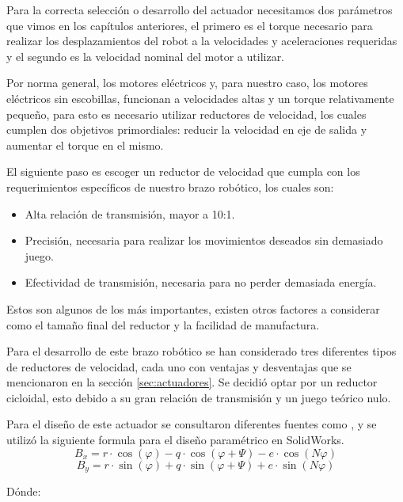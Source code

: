 Para la correcta selección o desarrollo del actuador necesitamos dos parámetros que vimos en los capítulos anteriores, el primero es el torque necesario para realizar los desplazamientos del robot a la velocidades y aceleraciones requeridas y el segundo es la velocidad nominal del motor a utilizar.

Por norma general, los motores eléctricos y, para nuestro caso, los motores eléctricos sin escobillas, funcionan a velocidades altas y un torque relativamente pequeño, para esto es necesario utilizar reductores de velocidad, los cuales cumplen dos objetivos primordiales: reducir la velocidad en eje de salida y aumentar el torque en el mismo.

El siguiente paso es escoger un reductor de velocidad que cumpla con los requerimientos específicos de nuestro brazo robótico, los cuales son:

\begin{itemize}
\itemsep0em
\item Alta relación de transmisión, mayor a 10:1.
\item Precisión, necesaria para realizar los movimientos deseados sin demasiado juego. 
\item Efectividad de transmisión, necesaria para no perder demasiada energía.
\end{itemize}

Estos son algunos de los más importantes, existen otros factores a considerar como el tamaño final del reductor y la facilidad de manufactura.

Para el desarrollo de este brazo robótico se han considerado tres diferentes tipos de reductores de velocidad, cada uno con ventajas y desventajas que se mencionaron en la sección \ref{sec:actuadores}. Se decidió optar por un reductor cicloidal, esto debido a su gran relación de transmisión y un juego teórico nulo.  

Para el diseño de este actuador se consultaron diferentes fuentes como \cite{Lei2012} \cite{Nachimowicz2016}, y se utilizó la siguiente formula para el diseño paramétrico en SolidWorks.
\begin{equation}
B_x = r  \cdot \cos(\varphi) - q \cdot \cos(\varphi + \Psi) - e \cdot \cos(N\varphi)
\end{equation}
\begin{equation}
B_y = r  \cdot \sin(\varphi) + q \cdot \sin(\varphi + \Psi) + e \cdot \sin(N\varphi)
\end{equation}

Dónde:

